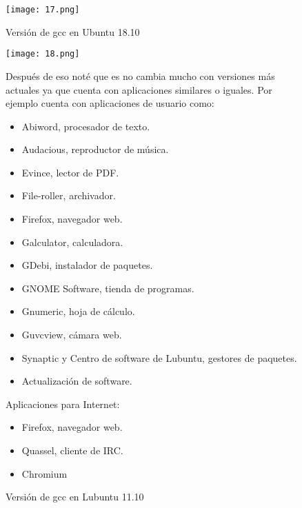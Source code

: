 \documentclass[11pt, a4paper]{report}
\begin{document}
      \begin{figure}[!ht] 
    \begin{center}  
      \texttt{[image: 17.png]} 
      \caption{Versión de gcc en Ubuntu 18.10} 
    \end{center} 
  \end{figure}

  \begin{figure}[!ht] 
    \begin{center}  
      \texttt{[image: 18.png]} 
      \caption{Versión de gcc en Lubuntu 11.10} 
    \end{center}

    Después de eso noté que es no cambia mucho con versiones más actuales ya que
    cuenta con aplicaciones similares o iguales. Por ejemplo cuenta con
    aplicaciones de usuario como: \\

    \begin{itemize}
    \item Abiword, procesador de texto.
    \item Audacious, reproductor de música.
    \item Evince, lector de PDF.
    \item File-roller, archivador.
    \item Firefox, navegador web.
    \item Galculator, calculadora.
    \item GDebi, instalador de paquetes.
    \item GNOME Software, tienda de programas.
    \item Gnumeric, hoja de cálculo.
    \item Guvcview, cámara web.
    \item Synaptic y Centro de software de Lubuntu, gestores de paquetes.
    \item Actualización de software.
    \end{itemize}

    Aplicaciones para Internet: \\

    \begin{itemize}
    \item Firefox, navegador web.
    \item Quassel, cliente de IRC.
    \item Chromium
    \end{itemize}
    
  \end{figure}
\end{document}
